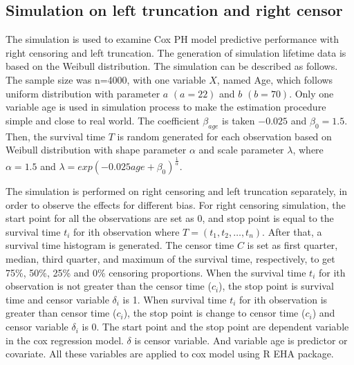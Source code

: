 \subsection{Simulation on left truncation and right censor}
The simulation is used to examine Cox PH model predictive performance with right censoring and left truncation. The generation  of simulation lifetime data is based on the Weibull distribution. %
The simulation can be described as follows. The sample size was n=4000, with one variable $X$, named Age, which follows uniform distribution with parameter $a$ $(a=22)$ and $b$ $(b=70)$. Only one variable age is used in simulation process to make the estimation procedure simple and close to real world. The coefficient $\beta_{age}$ is taken $-0.025$ and $\beta_0=1.5$. 
Then, the survival time $T$ is random generated for each observation based on Weibull distribution with shape parameter $\alpha$ and scale parameter $\lambda$, where $\alpha=1.5$ and $\lambda=exp(-0.025age+\beta_0)^{\frac{1}{\alpha}}$.

The simulation is performed on right censoring and left truncation separately, in order to observe the effects for different bias.  
For right censoring simulation, the start point for all the observations are set as 0, and stop point is equal to the survival time $t_i$ for ith observation where $T=(t_1, t_2, \ldots, t_n)$. After that, a survival time histogram is generated. The censor time $C$ is set as first quarter, median, third quarter, and maximum of the survival time, respectively, to get 75\%, 50\%, 25\% and 0\% censoring proportions. When the survival time $t_i$ for ith observation is not greater than the censor time ($c_i$), the stop point is survival time and censor variable $\delta_i$ is 1. When survival time $t_i$ for ith observation is greater than censor time ($c_i$), the stop point is change to censor time ($c_i$) and censor variable $\delta_i$ is  0. The start point and the stop point are dependent variable in the cox regression model. $\delta$ is censor variable. And variable age is predictor or covariate. All these variables are applied to cox model using R EHA package. 


